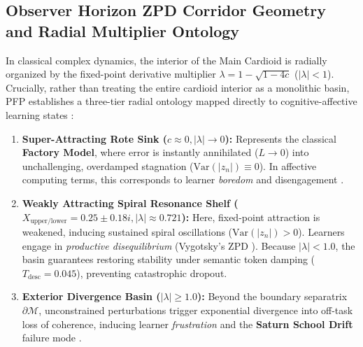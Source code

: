 \documentclass[10pt,twocolumn,a4paper]{article}
\begin{document}
\subsection{Observer Horizon ZPD Corridor Geometry and Radial Multiplier Ontology}
In classical complex dynamics, the interior of the Main Cardioid is radially organized by the fixed-point derivative multiplier $\lambda = 1 - \sqrt{1 - 4c}$ ($|\lambda| < 1$). Crucially, rather than treating the entire cardioid interior as a monolithic basin, PFP establishes a three-tier radial ontology mapped directly to cognitive-affective learning states \cite{baker2010better}:
\begin{enumerate}[leftmargin=*,nosep]
    \item \textbf{Super-Attracting Rote Sink ($c \approx 0, |\lambda| \to 0$):} Represents the classical \textbf{Factory Model}, where error is instantly annihilated ($L \to 0$) into unchallenging, overdamped stagnation ($\text{Var}(|z_n|) \equiv 0$). In affective computing terms, this corresponds to learner \textit{boredom} and disengagement \cite{baker2010better}.
    \item \textbf{Weakly Attracting Spiral Resonance Shelf ($X_{\text{upper/lower}} = 0.25 \pm 0.18i, |\lambda| \approx 0.721$):} Here, fixed-point attraction is weakened, inducing sustained spiral oscillations ($\text{Var}(|z_n|) > 0$). Learners engage in \textit{productive disequilibrium} (Vygotsky's ZPD \cite{vygotsky1978mind}). Because $|\lambda| < 1.0$, the basin guarantees restoring stability under semantic token damping ($T_{\text{desc}} = 0.045$), preventing catastrophic dropout.
    \item \textbf{Exterior Divergence Basin ($|\lambda| \ge 1.0$):} Beyond the boundary separatrix $\partial\mathcal{M}$, unconstrained perturbations trigger exponential divergence into off-task loss of coherence, inducing learner \textit{frustration} and the \textbf{Saturn School Drift} failure mode \cite{bennett1991saturn,reigeluth2008chaos}.
\end{enumerate}
\end{document}
